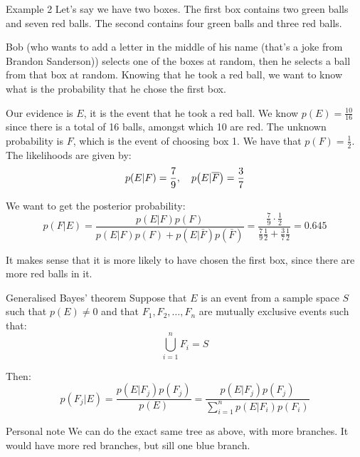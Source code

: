 \documentclass[a4paper]{article}
\begin{document}
\begin{parag}{Example 2}
    Let's say we have two boxes. The first box contains two green balls and seven red balls. The second contains four green balls and three red balls.

    Bob (who wants to add a letter in the middle of his name (that's a joke from Brandon Sanderson)) selects one of the boxes at random, then he selects a ball from that box at random. Knowing that he took a red ball, we want to know what is the probability that he chose the first box.

    Our evidence is $E$, it is the event that he took a red ball. We know $p\left(E\right) = \frac{10}{16}$ since there is a total of 16 balls, amongst which 10 are red. The unknown probability is $F$, which is the event of choosing box 1. We have that $p\left(F\right) = \frac{1}{2}$. The likelihoods are given by: 
    \[p\left(E|F\right) = \frac{7}{9}, \mathspace p\left(E | \bar{F}\right) = \frac{3}{7}\]

    We want to get the posterior probability:
    \[p\left(F|E\right) = \frac{p\left(E | F\right)p\left(F\right)}{p\left(E | F\right)p\left(F\right) + p\left(E|\bar{F}\right)p\left(\bar{F}\right)} = \frac{\frac{7}{9} \cdot \frac{1}{2}}{\frac{7}{9} \frac{1}{2} + \frac{3}{7} \frac{1}{2}} = 0.645\]

    It makes sense that it is more likely to have chosen the first box, since there are more red balls in it.
\end{parag}

\begin{parag}{Generalised Bayes' theorem}
    Suppose that $E$ is an event from a sample space $S$ such that $p\left(E\right) \neq 0$ and that $F_1, F_2, \ldots, F_n$ are mutually exclusive events such that: 
    \[\bigcup_{i=1}^n F_i = S\]
    
    Then:
    \[p\left(F_j|E\right) = \frac{p\left(E|F_j\right)p\left(F_j\right)}{p\left(E\right)} = \frac{p\left(E | F_j\right)p\left(F_j\right)}{\sum\limits_{i=1}^{n} p\left(E|F_i\right)p\left(F_i\right)}\]
    
    \begin{subparag}{Personal note}
        We can do the exact same tree as above, with more branches. It would have more red branches, but sill one blue branch.
    \end{subparag}
\end{parag}
\end{document}
